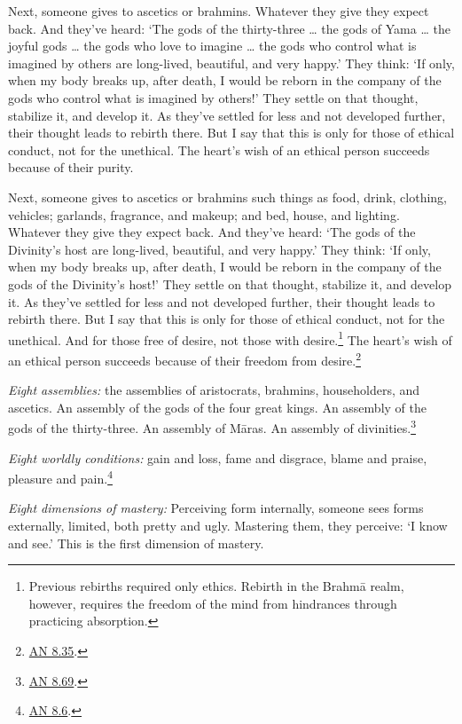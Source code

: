\documentclass[12pt,openany]{book}%
\begin{document}
Next, someone gives to ascetics or brahmins. Whatever they give they expect back. And they’ve heard: ‘The gods of the thirty-three … the gods of Yama … the joyful gods … the gods who love to imagine … the gods who control what is imagined by others are long-lived, beautiful, and very happy.’ They think: ‘If only, when my body breaks up, after death, I would be reborn in the company of the gods who control what is imagined by others!’ They settle on that thought, stabilize it, and develop it. As they’ve settled for less and not developed further, their thought leads to rebirth there. But I say that this is only for those of ethical conduct, not for the unethical. The heart’s wish of an ethical person succeeds because of their purity. 

Next, someone gives to ascetics or brahmins such things as food, drink, clothing, vehicles; garlands, fragrance, and makeup; and bed, house, and lighting. Whatever they give they expect back. And they’ve heard: ‘The gods of the Divinity’s host are long-lived, beautiful, and very happy.’ They think: ‘If only, when my body breaks up, after death, I would be reborn in the company of the gods of the Divinity’s host!’ They settle on that thought, stabilize it, and develop it. As they’ve settled for less and not developed further, their thought leads to rebirth there. But I say that this is only for those of ethical conduct, not for the unethical. And for those free of desire, not those with desire.\footnote{Previous rebirths required only ethics. Rebirth in the \textsanskrit{Brahmā} realm, however, requires the freedom of the mind from hindrances through practicing absorption. } The heart’s wish of an ethical person succeeds because of their freedom from desire.\footnote{\href{https://suttacentral.net/an8.35/en/sujato}{AN 8.35}. } 

\emph{Eight assemblies:} the assemblies of aristocrats, brahmins, householders, and ascetics. An assembly of the gods of the four great kings. An assembly of the gods of the thirty-three. An assembly of \textsanskrit{Māras}. An assembly of divinities.\footnote{\href{https://suttacentral.net/an8.69/en/sujato}{AN 8.69}. } 

\emph{Eight worldly conditions:} gain and loss, fame and disgrace, blame and praise, pleasure and pain.\footnote{\href{https://suttacentral.net/an8.6/en/sujato}{AN 8.6}. } 

\emph{Eight dimensions of mastery:} Perceiving form internally, someone sees forms externally, limited, both pretty and ugly. Mastering them, they perceive: ‘I know and see.’ This is the first dimension of mastery. 
\end{document}
